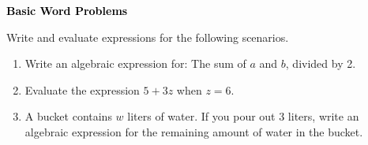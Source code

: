 \documentclass[12pt, letterpaper, fleqn]{article}
\begin{document}
\newpage

\begin{tcolorbox}[colback=black!10]
\large\textcolor{black}{\textbf{Basic Word Problems}}
\end{tcolorbox}

\noindent
Write and evaluate expressions for the following scenarios.

\vspace{3mm}

\begin{enumerate}[itemsep=2.2cm, leftmargin=0.6cm]

\item Write an algebraic expression for: The sum of $a$ and $b$, divided by 2.

\vspace{2.2cm}

\item Evaluate the expression $5 + 3z$ when $z = 6$.

\vspace{2.2cm}

\item A bucket contains $w$ liters of water. If you pour out 3 liters, write an algebraic expression for the remaining amount of water in the bucket.

\vspace{2.2cm}

\end{enumerate}
\end{document}
